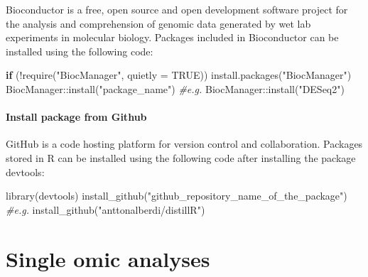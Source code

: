 \documentclass[
]{book}
\newenvironment{Shaded}{\begin{snugshade}}{\end{snugshade}}
\newcommand{\AttributeTok}[1]{\textcolor[rgb]{0.77,0.63,0.00}{#1}}
\newcommand{\CommentTok}[1]{\textcolor[rgb]{0.56,0.35,0.01}{\textit{#1}}}
\newcommand{\ConstantTok}[1]{\textcolor[rgb]{0.00,0.00,0.00}{#1}}
\newcommand{\ControlFlowTok}[1]{\textcolor[rgb]{0.13,0.29,0.53}{\textbf{#1}}}
\newcommand{\FunctionTok}[1]{\textcolor[rgb]{0.00,0.00,0.00}{#1}}
\newcommand{\NormalTok}[1]{#1}
\newcommand{\SpecialCharTok}[1]{\textcolor[rgb]{0.00,0.00,0.00}{#1}}
\newcommand{\StringTok}[1]{\textcolor[rgb]{0.31,0.60,0.02}{#1}}
\begin{document}
Bioconductor is a free, open source and open development software project for the analysis and comprehension of genomic data generated by wet lab experiments in molecular biology. Packages included in Bioconductor can be installed using the following code:

\small

\begin{Shaded}
\begin{Highlighting}[]
\ControlFlowTok{if}\NormalTok{ (}\SpecialCharTok{!}\FunctionTok{require}\NormalTok{(}\StringTok{"BiocManager"}\NormalTok{, }\AttributeTok{quietly =} \ConstantTok{TRUE}\NormalTok{))}
    \FunctionTok{install.packages}\NormalTok{(}\StringTok{"BiocManager"}\NormalTok{)}
\NormalTok{BiocManager}\SpecialCharTok{::}\FunctionTok{install}\NormalTok{(}\StringTok{"package\_name"}\NormalTok{)}
\CommentTok{\#e.g.}
\NormalTok{BiocManager}\SpecialCharTok{::}\FunctionTok{install}\NormalTok{(}\StringTok{"DESeq2"}\NormalTok{)}
\end{Highlighting}
\end{Shaded}

\normalsize

\hypertarget{install-package-from-github}{%
\subsubsection*{Install package from Github}\label{install-package-from-github}}

GitHub is a code hosting platform for version control and collaboration. Packages stored in R can be installed using the following code after installing the package devtools:

\small

\begin{Shaded}
\begin{Highlighting}[]
\FunctionTok{library}\NormalTok{(devtools)}
\FunctionTok{install\_github}\NormalTok{(}\StringTok{"github\_repository\_name\_of\_the\_package"}\NormalTok{)}
\CommentTok{\#e.g.}
\FunctionTok{install\_github}\NormalTok{(}\StringTok{"anttonalberdi/distillR"}\NormalTok{)}
\end{Highlighting}
\end{Shaded}

\normalsize

\hypertarget{single-omic-analyses}{%
\chapter{Single omic analyses}\label{single-omic-analyses}}
\end{document}
